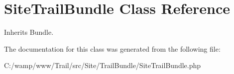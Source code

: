 \hypertarget{class_site_1_1_trail_bundle_1_1_site_trail_bundle}{}\section{Site\+Trail\+Bundle Class Reference}
\label{class_site_1_1_trail_bundle_1_1_site_trail_bundle}


Inherits Bundle.



The documentation for this class was generated from the following file\+:\begin{DoxyCompactItemize}
\item 
C\+:/wamp/www/\+Trail/src/\+Site/\+Trail\+Bundle/Site\+Trail\+Bundle.\+php\end{DoxyCompactItemize}
